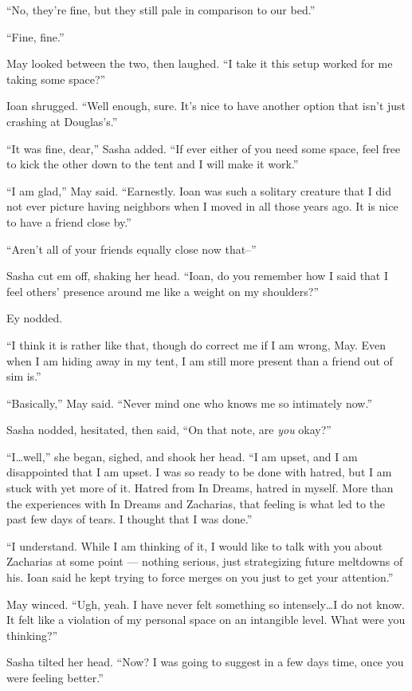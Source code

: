 ``No, they're fine, but they still pale in comparison to our bed.''

``Fine, fine.''

May looked between the two, then laughed. ``I take it this setup worked for me taking some space?''

Ioan shrugged. ``Well enough, sure. It's nice to have another option that isn't just crashing at Douglas's.''

``It was fine, dear,'' Sasha added. ``If ever either of you need some space, feel free to kick the other down to the tent and I will make it work.''

``I am glad,'' May said. ``Earnestly. Ioan was such a solitary creature that I did not ever picture having neighbors when I moved in all those years ago. It is nice to have a friend close by.''

``Aren't all of your friends equally close now that--''

Sasha cut em off, shaking her head. ``Ioan, do you remember how I said that I feel others' presence around me like a weight on my shoulders?''

Ey nodded.

``I think it is rather like that, though do correct me if I am wrong, May. Even when I am hiding away in my tent, I am still more present than a friend out of sim is.''

``Basically,'' May said. ``Never mind one who knows me so intimately now.''

Sasha nodded, hesitated, then said, ``On that note, are \emph{you} okay?''

``I\ldots well,'' she began, sighed, and shook her head. ``I am upset, and I am disappointed that I am upset. I was so ready to be done with hatred, but I am stuck with yet more of it. Hatred from In Dreams, hatred in myself. More than the experiences with In Dreams and Zacharias, that feeling is what led to the past few days of tears. I thought that I was done.''

``I understand. While I am thinking of it, I would like to talk with you about Zacharias at some point — nothing serious, just strategizing future meltdowns of his. Ioan said he kept trying to force merges on you just to get your attention.''

May winced. ``Ugh, yeah. I have never felt something so intensely\ldots I do not know. It felt like a violation of my personal space on an intangible level. What were you thinking?''

Sasha tilted her head. ``Now? I was going to suggest in a few days time, once you were feeling better.''

